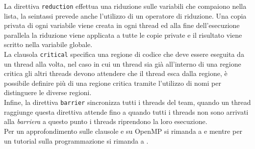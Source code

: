 La direttiva \texttt{reduction} effettua una riduzione sulle variabili che compaiono nella lista, la seintassi prevede anche l'utilizzo di un operatore di riduzione. Una copia privata di ogni variabile viene creata in ogni thread ed alla fine dell'esecuzione parallela la riduzione viene applicata a tutte le copie private e il risultato viene scritto nella variabile globale.\\
La clausola \texttt{critical} specifica una regione di codice che deve essere eseguita da un thread alla volta, nel caso in cui un thread sia già all'interno di una regione critica gli altri threads devono attendere che il thread esca dalla regione, è possibile definire più di una regione critica tramite l'utilizzo di nomi per distinguere le diverse regioni.\\
Infine, la direttiva \texttt{barrier} sincronizza tutti i threads del team, quando un thread raggiunge questa direttiva attende fino a quando tutti i threads non sono arrivati alla \emph{barriera} a questo punto i threads riprendono la loro esecuzione.\\
Per un approfondimento sulle clausole e su OpenMP si rimanda a \cite{cugola:openmp} e \cite{openmp:org} mentre per un tutorial sulla programmazione si rimanda a \cite{tutorial:openmp}.
